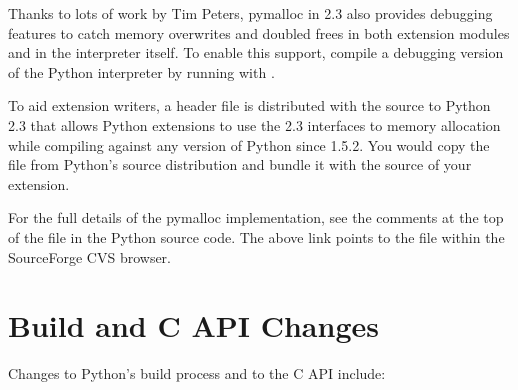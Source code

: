 \documentclass{howto}
\begin{document}
Thanks to lots of work by Tim Peters, pymalloc in 2.3 also provides
debugging features to catch memory overwrites and doubled frees in
both extension modules and in the interpreter itself.  To enable this
support, compile a debugging version of the Python interpreter by
running  with .

To aid extension writers, a header file  is
distributed with the source to Python 2.3 that allows Python
extensions to use the 2.3 interfaces to memory allocation while
compiling against any version of Python since 1.5.2.  You would copy
the file from Python's source distribution and bundle it with the
source of your extension.

\begin{seealso}

{For the full details of the pymalloc implementation, see
the comments at the top of the file  in the
Python source code.  The above link points to the file within the
SourceForge CVS browser.}

\end{seealso}


\section{Build and C API Changes}

Changes to Python's build process and to the C API include:
\end{document}
